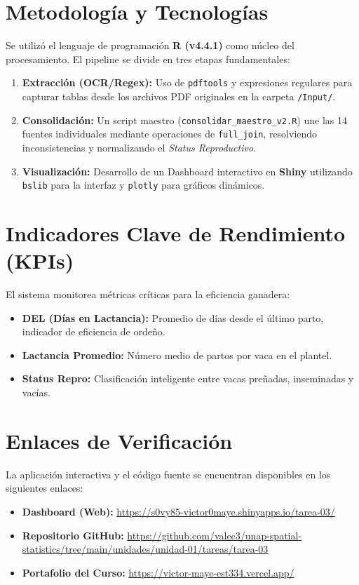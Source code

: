 \documentclass[11pt,a4paper]{article}
\begin{document}
\section{Metodología y Tecnologías}
Se utilizó el lenguaje de programación \textbf{R (v4.4.1)} como núcleo del procesamiento. El pipeline se divide en tres etapas fundamentales:

\begin{enumerate}
    \item \textbf{Extracción (OCR/Regex):} Uso de \texttt{pdftools} y expresiones regulares para capturar tablas desde los archivos PDF originales en la carpeta \texttt{/Input/}.
    \item \textbf{Consolidación:} Un script maestro (\texttt{consolidar\_maestro\_v2.R}) une las 14 fuentes individuales mediante operaciones de \texttt{full\_join}, resolviendo inconsistencias y normalizando el \textit{Status Reproductivo}.
    \item \textbf{Visualización:} Desarrollo de un Dashboard interactivo en \textbf{Shiny} utilizando \texttt{bslib} para la interfaz y \texttt{plotly} para gráficos dinámicos.
\end{enumerate}

\section{Indicadores Clave de Rendimiento (KPIs)}
El sistema monitorea métricas críticas para la eficiencia ganadera:
\begin{itemize}
    \item \textbf{DEL (Días en Lactancia):} Promedio de días desde el último parto, indicador de eficiencia de ordeño.
    \item \textbf{Lactancia Promedio:} Número medio de partos por vaca en el plantel.
    \item \textbf{Status Repro:} Clasificación inteligente entre vacas preñadas, inseminadas y vacías.
\end{itemize}

\section{Enlaces de Verificación}
La aplicación interactiva y el código fuente se encuentran disponibles en los siguientes enlaces:

\vspace{0.5cm}
\begin{itemize}
    \item \textbf{Dashboard (Web):} \href{https://s0vy85-victor0maye.shinyapps.io/tarea-03/}{https://s0vy85-victor0maye.shinyapps.io/tarea-03/}
    \item \textbf{Repositorio GitHub:} \href{https://github.com/valec3/unap-spatial-statistics/tree/main/unidades/unidad-01/tareas/tarea-03}{https://github.com/valec3/unap-spatial-statistics/tree/main/unidades/unidad-01/tareas/tarea-03}
    \item \textbf{Portafolio del Curso:} \href{https://victor-maye-est334.vercel.app/}{https://victor-maye-est334.vercel.app/}
\end{itemize}
\end{document}
